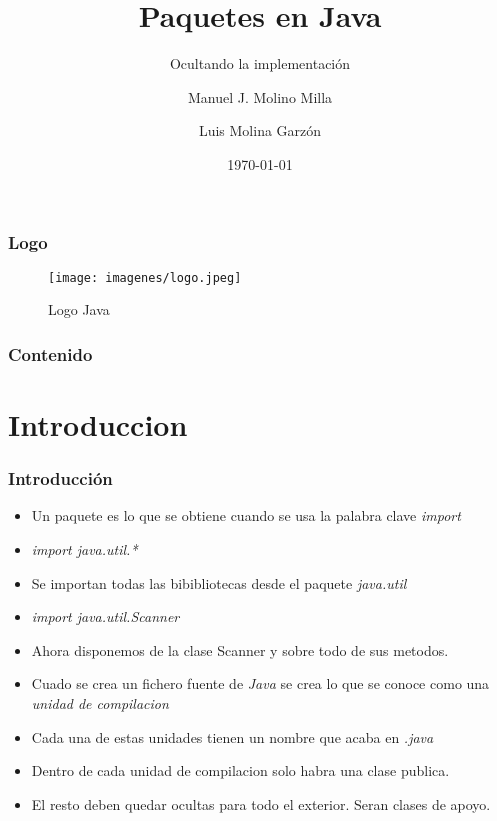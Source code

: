 \documentclass{beamer}
\title{Paquetes en Java}
\subtitle{Ocultando la implementación}
\author{Manuel J. Molino Milla \and Luis Molina Garzón}
\date{\today} %
\institute{IES Virgen del Carmen \and Departamento de Informática}
\begin{document}
\begin{frame}
  \titlepage
\end{frame}

\begin{frame}
    \frametitle{Logo}
\begin{figure}
\texttt{[image: imagenes/logo.jpeg]} 
\caption{Logo Java}
\end{figure}
\end{frame}

\begin{frame}
  \frametitle{Contenido}
  \tableofcontents[pausesections]
\end{frame}



\section{Introduccion}

\begin{frame}
    \frametitle{Introducción}

\begin{itemize}[<+-| alert@+>]
      \item Un paquete es lo que se obtiene cuando se usa la palabra clave \emph{import}
      \item \emph{import java.util.*}
      \item Se importan todas las bibibliotecas desde el paquete \emph{java.util}      
      \item \emph{import java.util.Scanner}
      \item Ahora disponemos de la clase Scanner y sobre todo de sus metodos.
      \item Cuado se crea un fichero fuente de \emph{Java} se crea lo que se conoce como una \emph{unidad de compilacion}
      \item Cada una de estas unidades tienen un nombre que acaba en \emph{.java}
      \item Dentro de cada unidad de compilacion solo habra una clase publica.
      \item El resto deben quedar ocultas para todo el exterior. Seran clases de apoyo.
    \end{itemize}
    \pause
\end{frame}
\end{document}
